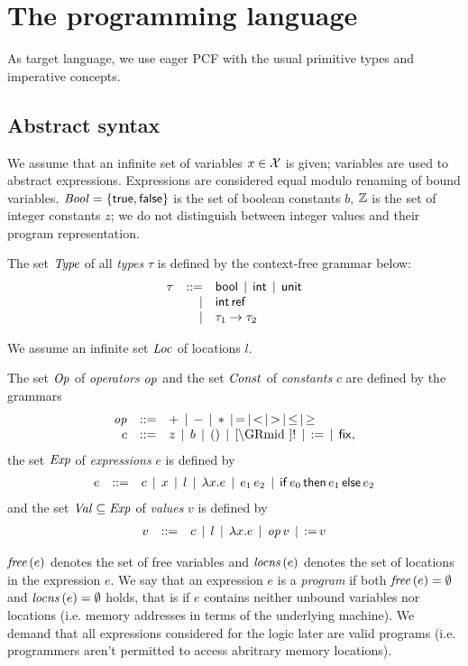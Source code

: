 \documentclass[12pt,a4paper]{report}
\begin{document}

\chapter{The programming language}

As target language, we use eager PCF with the usual primitive types and imperative concepts.



\section{Abstract syntax}

We assume that an infinite set of variables $x \in \mathcal{X}$ is given; variables are used to
abstract expressions. Expressions are considered equal modulo renaming of bound variables.
$\mathit{Bool}=\{\mathsf{true},\mathsf{false}\}$ is the set of boolean constants $b$, $\mathbb Z$ is the set of integer
constants $z$; we do not distinguish between integer values and their program representation.

\begin{definition}[Types]
  The set $\mathit{Type}$ of all {\em types} $\tau$ is defined by the context-free grammar below:
  \[\begin{array}{rrlll}
    \tau  & ::= & \mathsf{bool} \,\mid\, \mathsf{int} \,\mid\, \mathsf{unit}
          \\ & \mid & \mathsf{int}\,\mathsf{ref}
          \\ & \mid & \tau_1\to\tau_2
  \end{array}\]
\end{definition}

We assume an infinite set $\mathit{Loc}$ of locations $l$.

\begin{definition}[Expressions]
  The set $\mathit{Op}$ of {\em operators} $\mathit{op}$ and the set $\mathit{Const}$ of {\em constants} $c$
  are defined by the grammars
  \[\GRbeg
    \op \GRis + \GRmid - \GRmid * \GRmid = \GRmid < \GRmid > \GRmid \le \GRmid \ge \\
    c \GRis z \GRmid b \GRmid \unit \GRmid \cref \GRmid !
             \GRmid \assign \GRmid \fix,
  \GRend\]
  the set $\mathit{Exp}$ of {\em expressions} $e$ is defined by
  \[\begin{array}{rrlll}
    e & ::= & c \,\mid\, x \,\mid\, l \,\mid\, \lambda x.e \,\mid\, e_1\,e_2
           \,\mid\, \mathsf{if}\,e_0\,\mathsf{then}\,e_1\,\mathsf{else}\,e_2
  \end{array}\]
  and the set $\mathit{Val} \subseteq \mathit{Exp}$ of {\em values} $v$ is defined by
  \[\begin{array}{rrlll}
    v & ::= & c \,\mid\, l \,\mid\, \lambda x.e \,\mid\, \mathit{op}\,v \,\mid\, \mathsf{:=}\,v
  \end{array}\]
\end{definition}

$\mathit{free}\,(e)$ denotes the set of free variables and $\mathit{locns}\,(e)$ denotes the set of locations in the
expression $e$. We say that an expression $e$ is a {\em program} if both $\mathit{free}\,(e)=\emptyset$
and $\mathit{locns}\,(e)=\emptyset$ holds, that is if $e$ contains neither unbound variables nor
locations (i.e. memory addresses in terms of the underlying machine). We demand that all expressions
considered for the logic later are valid programs (i.e. programmers aren't permitted to access
abritrary memory locations).
\end{document}
